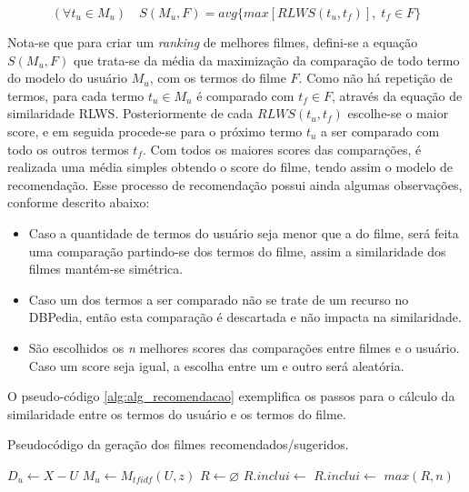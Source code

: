 \begin{equation}
	(\forall t_u \in M_u) \quad S(M_u, F) = avg \{max [RLWS(t_u, t_f)], \; t_f \in F\}
\label{eq:rec_model_similarity}
\end{equation}

Nota-se que para criar um \textit{ranking} de melhores filmes, defini-se a equação $S(M_u, F)$ que trata-se da média da maximização da comparação de todo termo do modelo do usuário $M_u$, com os termos do filme $F$. Como não há repetição de termos, para cada termo $t_u \in M_u$ é comparado com  $t_f \in F$, através da equação de similaridade \ac{RLWS}. Posteriormente de cada $RLWS(t_u, t_f)$ escolhe-se o maior score, e em seguida procede-se para o próximo termo $t_u$ a ser comparado com todo os outros termos $t_f$. Com todos os maiores scores das comparações, é realizada uma média simples obtendo o score do filme, tendo assim o modelo de recomendação. Esse processo de recomendação possui ainda algumas observações, conforme descrito abaixo:

\begin{itemize}
	\item{Caso a quantidade de termos do usuário seja menor que a do filme, será feita uma comparação partindo-se dos termos do filme, assim a similaridade dos filmes mantém-se simétrica.}
	\item{Caso um dos termos a ser comparado não se trate de um recurso no DBPedia, então esta comparação é descartada e não impacta na similaridade.}
	\item{São escolhidos os \textit{n} melhores scores das comparações entre filmes e o usuário. Caso um score seja igual, a escolha entre um e outro será aleatória.}
\end{itemize}

O pseudo-código \ref{alg:alg_recomendacao} exemplifica os passos para o cálculo da similaridade entre os termos do usuário e os termos do filme.

\begin{algorithm}
	\caption{Pseudocódigo da geração dos filmes recomendados/sugeridos.}
    \begin{algorithmic}[1]
        	\State $D_u \gets X - U$
        	\State $M_u \gets M_{tfidf}(U, z)$
        	\State $R \gets \varnothing$
        			\State $R.inclui \gets$ 
				\Else
					\State $R.inclui \gets$ 	
        		\EndIf
        	\EndFor
        	\Return $max(R, n)$ 
        \EndFunction
    \end{algorithmic}
\label{alg:alg_recomendacao}
\end{algorithm}

